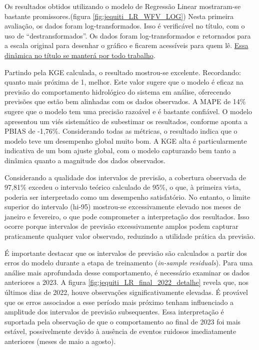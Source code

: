 Os resultados obtidos utilizando o modelo de Regressão Linear mostraram-se bastante promissores.(figura \ref{fig:jequiti_LR_WFV_LOG}) Nesta primeira avaliação, os dados foram log-transformados. Isso é verificável no título, com o uso de ``destransformados''. Os dados foram log-transformados e retornados para a escala original para desenhar o gráfico e ficarem acessíveis para quem lê. \underline{Essa dinâmica no título se manterá por todo trabalho}.

Partindo pela KGE calculada, o resultado mostrou-se excelente. Recordando: quanto mais próxima de 1, melhor. Este valor sugere que o modelo é eficaz na previsão do comportamento hidrológico do sistema em análise, oferecendo previsões que estão bem alinhadas com os dados observados. A MAPE de 14\% sugere que o modelo tem uma precisão razoável e é bastante confiável. O modelo apresentou um viés sistemático de subestimar os resultados, conforme aponta a PBIAS de -1,76\%. Considerando todas as métricas, o resultado indica que o modelo teve um desempenho global muito bom. A KGE alta é particularmente indicativa de um bom ajuste global, com o modelo capturando bem tanto a dinâmica quanto a magnitude dos dados observados.

Considerando a qualidade dos intervalos de previsão, a cobertura observada de 97,81\% excedeu o intervalo teórico calculado de 95\%, o que, à primeira vista, poderia ser interpretado como um desempenho satisfatório. No entanto, o limite superior do intervalo (hi-95) mostrou-se excessivamente elevado nos meses de janeiro e fevereiro, o que pode comprometer a interpretação dos resultados. Isso ocorre porque intervalos de previsão excessivamente amplos podem capturar praticamente qualquer valor observado, reduzindo a utilidade prática da previsão.

É importante destacar que os intervalos de previsão são calculados a partir dos erros do modelo durante a etapa de treinamento (\textit{in-sample residuals}). Para uma análise mais aprofundada desse comportamento, é necessário examinar os dados anteriores a 2023. A figura \ref{fig:jequiti_LR_final_2022_detalhe} revela que, nos últimos dias de 2022, houve observações significativamente elevadas. É provável que os erros associados a esse período mais próximo tenham influenciado a amplitude dos intervalos de previsão subsequentes. Essa interpretação é suportada pela observação de que o comportamento ao final de 2023 foi mais estável, possivelmente devido à ausência de eventos ruidosos imediatamente anteriores (meses de maio a agosto).

